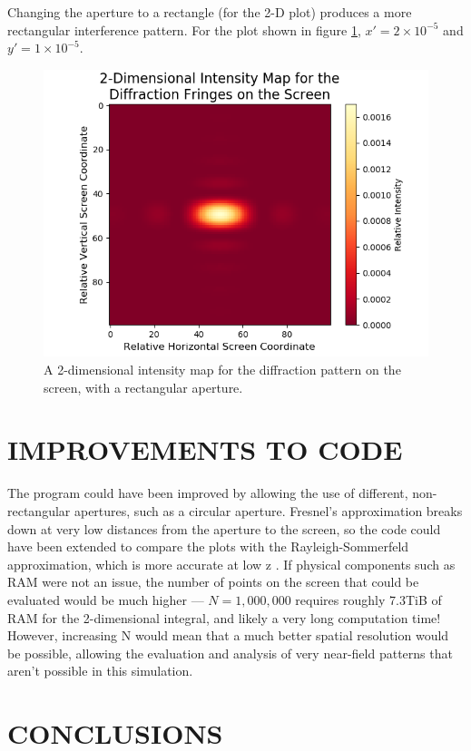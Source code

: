 \documentclass[twocolumn,prl,nobalancelastpage,aps,10pt]{revtex4-1}
\begin{document}
Changing the aperture to a rectangle (for the 2-D plot) produces a more rectangular interference pattern. For the plot shown in figure \ref{2D_Rectangular}, $x'=2\times10^{-5}$ and $y'=1\times10^{-5}$.
\begin{figure}[!ht]
	\includegraphics*[width=0.96\linewidth,clip]{2D_Rectangular}
	\caption{A 2-dimensional intensity map for the diffraction pattern on the screen, with a rectangular aperture.} \label{2D_Rectangular}
\end{figure}

\section{IMPROVEMENTS TO CODE}
The program could have been improved by allowing the use of different, non-rectangular apertures, such as a circular aperture. Fresnel's approximation breaks down at very low distances from the aperture to the screen, so the code could have been extended to compare the plots with the Rayleigh-Sommerfeld approximation, which is more accurate at low z \cite{DeBruijn1970}. If physical components such as RAM were not an issue, the number of points on the screen that could be evaluated would be much higher --- $N=1,000,000$ requires roughly 7.3TiB of RAM for the 2-dimensional integral, and likely a very long computation time! However, increasing N would mean that a much better spatial resolution would be possible, allowing the evaluation and analysis of very near-field patterns that aren't possible in this simulation.

\section{CONCLUSIONS}
\end{document}
